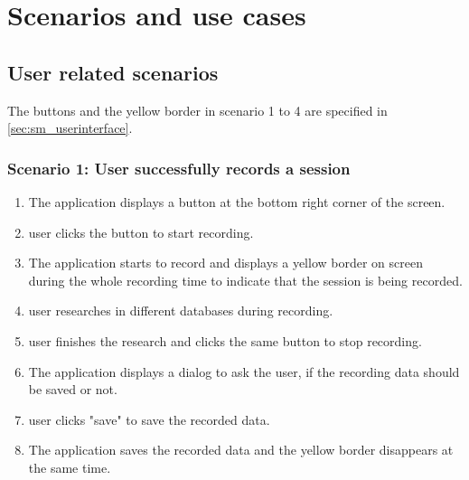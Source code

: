 \chapter{Scenarios and use cases}
\label{ch:scenarios}

\section{User related scenarios}
\newcommand{\see}[1][reference missing]{(see \specref{#1})}
The buttons and the yellow border in scenario 1 to 4 are specified in \ref{sec:sm_userinterface}.

\subsection{Scenario 1: User successfully records a session}
\begin{enumerate}
    \item The application displays a button at the bottom right corner of the screen.
    \item \Gls{user} clicks the button to start recording.
    \item The application starts to record and displays a yellow border on screen during the whole recording time to indicate that the \gls{session} is being recorded.
    \item \Gls{user} researches in different databases during recording.
    \item \Gls{user} finishes the research and clicks the same button to stop recording.
    \item The application displays a dialog to ask the \gls{user}, if the recording data should be saved or not.
    \item \Gls{user} clicks "save" to save the recorded data.
    \item The application saves the recorded data and the yellow border disappears at the same time.
\end{enumerate}

